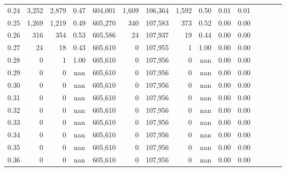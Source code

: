 \begin{tabular}{rrrcrrrrrrrrrrr}
0.24 &    3,252 &   2,879 &                                       0.47 &  604,001 &    1,609 &  106,364 &    1,592 &  0.50 &  0.01 &                         0.01 \\
0.25 &    1,269 &   1,219 &                                       0.49 &  605,270 &      340 &  107,583 &      373 &  0.52 &  0.00 &                         0.00 \\
0.26 &      316 &     354 &                                       0.53 &  605,586 &       24 &  107,937 &       19 &  0.44 &  0.00 &                         0.00 \\
0.27 &       24 &      18 &                                       0.43 &  605,610 &        0 &  107,955 &        1 &  1.00 &  0.00 &                         0.00 \\
0.28 &        0 &       1 &                                       1.00 &  605,610 &        0 &  107,956 &        0 &   nan &  0.00 &                         0.00 \\
0.29 &        0 &       0 &                                        nan &  605,610 &        0 &  107,956 &        0 &   nan &  0.00 &                         0.00 \\
0.30 &        0 &       0 &                                        nan &  605,610 &        0 &  107,956 &        0 &   nan &  0.00 &                         0.00 \\
0.31 &        0 &       0 &                                        nan &  605,610 &        0 &  107,956 &        0 &   nan &  0.00 &                         0.00 \\
0.32 &        0 &       0 &                                        nan &  605,610 &        0 &  107,956 &        0 &   nan &  0.00 &                         0.00 \\
0.33 &        0 &       0 &                                        nan &  605,610 &        0 &  107,956 &        0 &   nan &  0.00 &                         0.00 \\
0.34 &        0 &       0 &                                        nan &  605,610 &        0 &  107,956 &        0 &   nan &  0.00 &                         0.00 \\
0.35 &        0 &       0 &                                        nan &  605,610 &        0 &  107,956 &        0 &   nan &  0.00 &                         0.00 \\
0.36 &        0 &       0 &                                        nan &  605,610 &        0 &  107,956 &        0 &   nan &  0.00 &                         0.00 \\

\end{tabular}
